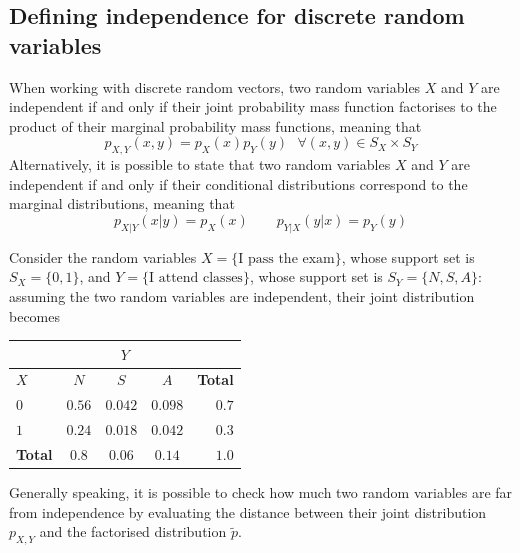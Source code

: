 \documentclass{report}
\begin{document}
\subsection{Defining independence for discrete random variables}
When working with discrete random vectors, two random variables $\displaystyle X$ and $\displaystyle Y$ are independent if and only if their joint probability mass function factorises to the product of their marginal probability mass functions, meaning that
\[p_{X, Y}(x, y) = p_X(x)p_Y(y) \text{ } \forall (x, y) \in S_X \times S_Y\]
Alternatively, it is possible to state that two random variables $\displaystyle X$ and $\displaystyle Y$ are independent if and only if their conditional distributions correspond to the marginal distributions, meaning that
\[p_{X|Y}(x|y) = p_X(x) \quad\quad p_{Y|X}(y|x) = p_Y(y) \]
\begin{examplebox}
    Consider the random variables $\displaystyle X = \{\text{I pass the exam}\}$, whose support set is $\displaystyle S_X = \{0, 1\}$, and $\displaystyle Y = \{\text{I attend classes}\}$, whose support set is $\displaystyle S_Y = \{N, S, A\}$: assuming the two random variables are independent, their joint distribution becomes
    
    {\centering
    \vspace{0.5em}
    \begin{tabular}{|l|c c c|r|}
        \hline
        & \multicolumn{3}{c|}{$Y$} & \\
        \hline
        $X$ & $N$ & $S$ & $A$ & \textbf{Total} \\
        \hline
        $0$ & $0.56$ & $0.042$ & $0.098$ & $0.7$ \\
        $1$ & $0.24$ & $0.018$ & $0.042$ & $0.3$ \\
        \hline
        \textbf{Total} & $0.8$ & $0.06$ & $0.14$ & $1.0$ \\
        \hline
    \end{tabular}
    \vspace{0.5em}\par}
    
    \noindent Generally speaking, it is possible to check how much two random variables are far from independence by evaluating the distance between their joint distribution $\displaystyle p_{X, Y}$ and the factorised distribution $\displaystyle \tilde{p}$.
\end{examplebox}
\end{document}
